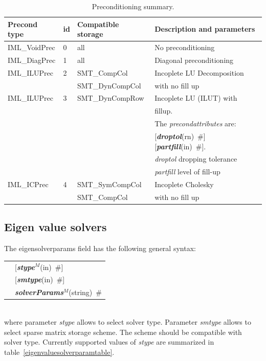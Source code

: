 \documentclass[a4paper]{article}
\makeatletter
\newcommand{\param}[1]{{\em #1}}
\newcommand{\keywordnotype}[1]{\mbox{{\it{\bf{#1}}}}}
\newcommand{\keyword}[2]{\mbox{{\keywordnotype{#1}\tiny (#2)}}}
\newcommand{\field}[2]{\mbox{\keyword{#1}{#2}~\#}}
\newcommand{\optField}[2]{\mbox{[\field{#1}{#2}]}}
\newenvironment{record}[1][]{\begin{tabular}{|ll}}{\end{tabular}\\}
\newcommand{\recentry}[2]{{#1}&{#2}\\}
\newcounter{rcc}
\newenvironment{record}[1][\textwidth]{\setcounter{rcc}{0}\begin{tabular*}{#1}{|ll@{\extracolsep{\fill}}r}}{\end{tabular*}\\}
\newcommand{\recentry}[2]{\ifthenelse{\value{rcc}>0}{&$\backslash$ \\}{\setcounter{rcc}{1}}{#1}&{#2}}
\makeatother
\begin{document}
\begin{table}[h]                                                                
\begin{center}                                                                  
\begin{tabular}{|l|l|l|l|}                                                      
\hline                                                                          
Precond type & id & Compatible storage & Description and parameters \\
\hline\hline
IML\_VoidPrec &0& all & No preconditioning\\
\hline
IML\_DiagPrec &1& all & Diagonal preconditioning\\
\hline
IML\_ILUPrec  &2& SMT\_CompCol & Incoplete LU Decomposition\\
              & & SMT\_DynCompCol&with no fill up\\
\hline
IML\_ILUPrec  &3& SMT\_DynCompRow & Incoplete LU (ILUT) with\\
              & &                 &  fillup. \\
              & &                 & The \param{precondattributes} are:\\
              & &                 & \optField{droptol}{rn}
\optField{partfill}{in}.\\
              & &                 & \param{droptol} dropping
tolerance\\
              & &                 & \param{partfill} level of
fill-up\\
\hline
IML\_ICPrec   &4& SMT\_SymCompCol&Incoplete Cholesky\\
              & & SMT\_CompCol   &with no fill up\\
\hline
\end{tabular}                                                                   
\caption{Preconditioning summary.}                
\label{precondtable}                                                         
\end{center}
\end{table}                                                                     

\subsection{Eigen value solvers}
\label{eigensolverssection}
The eigensolverparams field has the following general syntax:\\
\begin{record}
\recentry{\hspace{20mm}}{\optField{stype$^M$}{in}} \recentry{}{\optField{smtype}{in}} \recentry{}{\field{solverParams$^M$}{string}}
\end{record}
where parameter \param{stype} allows to select solver type. Parameter \param{smtype} allows to select sparse matrix storage
scheme. The scheme should be compatible with solver type. Currently supported values of \param{stype} are summarized in table~\ref{eigenvaluesolverparamtable}.
\end{document}
